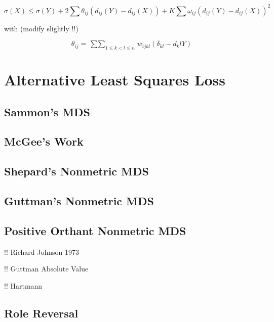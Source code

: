 \documentclass[
  12pt,
]{book}
\theoremstyle{definition}
\theoremstyle{definition}
\theoremstyle{definition}
\theoremstyle{definition}
\theoremstyle{remark}
\begin{document}
\[
\sigma(X)\leq\sigma(Y)+2\sum \theta_{ij}(d_{ij}(Y)-d_{ij}(X))+K\sum \omega_{ij}(d_{ij}(Y)-d_{ij}(X))^2
\]

with (modify slightly !!)

\[
\theta_{ij}=\mathop{\sum\sum}_{1\leq k<l\leq n}w_{ijkl}(\delta_{kl}-d_kl{Y})
\]

\hypertarget{alternative-least-squares-loss}{%
\chapter{Alternative Least Squares Loss}\label{alternative-least-squares-loss}}

\hypertarget{sammons-mds}{%
\section{Sammon's MDS}\label{sammons-mds}}

\hypertarget{mcgees-work}{%
\section{McGee's Work}\label{mcgees-work}}

\hypertarget{shepards-nonmetric-mds}{%
\section{Shepard's Nonmetric MDS}\label{shepards-nonmetric-mds}}

\hypertarget{guttmans-nonmetric-mds}{%
\section{Guttman's Nonmetric MDS}\label{guttmans-nonmetric-mds}}

\hypertarget{positive-orthant-nonmetric-mds}{%
\section{Positive Orthant Nonmetric MDS}\label{positive-orthant-nonmetric-mds}}

!! Richard Johnson 1973

!! Guttman Absolute Value

!! Hartmann

\hypertarget{interrole}{%
\section{Role Reversal}\label{interrole}}
\end{document}
